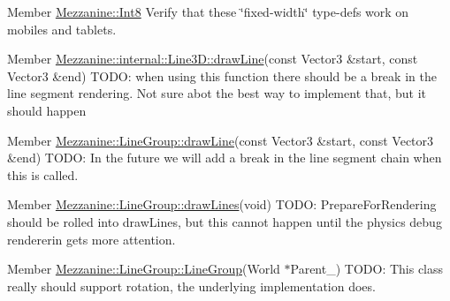 \label{todo__todo000009}
\hypertarget{todo__todo000009}{}
 
\begin{DoxyDescription}
\item[Member \hyperlink{namespaceMezzanine_acbb048ee99aa07566d5a6eb33f5a2c2d}{Mezzanine::Int8} ]Verify that these \char`\"{}fixed-\/width\char`\"{} type-\/defs work on mobiles and tablets.


\end{DoxyDescription}

\label{todo__todo000012}
\hypertarget{todo__todo000012}{}
 
\begin{DoxyDescription}
\item[Member \hyperlink{classMezzanine_1_1internal_1_1Line3D_a17264ad5672bef8807ce6b4a8366e573}{Mezzanine::internal::Line3D::drawLine}(const Vector3 \&start, const Vector3 \&end) ]TODO: when using this function there should be a break in the line segment rendering. Not sure abot the best way to implement that, but it should happen 
\end{DoxyDescription}

\label{todo__todo000014}
\hypertarget{todo__todo000014}{}
 
\begin{DoxyDescription}
\item[Member \hyperlink{classMezzanine_1_1LineGroup_acadb6f8ccbe70828b094f07a11f276ac}{Mezzanine::LineGroup::drawLine}(const Vector3 \&start, const Vector3 \&end) ]TODO: In the future we will add a break in the line segment chain when this is called. 
\end{DoxyDescription}

\label{todo__todo000015}
\hypertarget{todo__todo000015}{}
 
\begin{DoxyDescription}
\item[Member \hyperlink{classMezzanine_1_1LineGroup_a85da1685525915f1e07d685b98f79f23}{Mezzanine::LineGroup::drawLines}(void) ]TODO: PrepareForRendering should be rolled into drawLines, but this cannot happen until the physics debug rendererin gets more attention. 
\end{DoxyDescription}

\label{todo__todo000013}
\hypertarget{todo__todo000013}{}
 
\begin{DoxyDescription}
\item[Member \hyperlink{classMezzanine_1_1LineGroup_a8789254da1d3e930681b793165fedeca}{Mezzanine::LineGroup::LineGroup}(World $\ast$Parent\_\-) ]TODO: This class really should support rotation, the underlying implementation does. 
\end{DoxyDescription}

